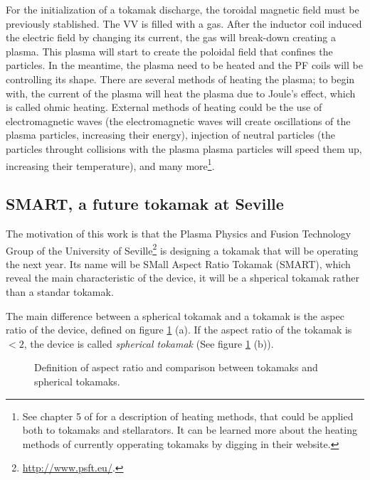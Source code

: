 \documentclass[a4paper,12pt,oneside]{book}
\begin{document}
For the initialization of a tokamak discharge, the toroidal magnetic field must be previously stablished. The VV is filled with a gas. After the inductor coil induced the electric field by changing its current, the gas will break-down creating a plasma. This plasma will start to create the poloidal field that confines the particles. In the meantime, the plasma need to be heated and the PF coils will be controlling its shape. There are several methods of heating the plasma; to begin with, the current of the plasma will heat the plasma due to Joule's effect, which is called ohmic heating. External methods of heating could be the use of electromagnetic waves (the electromagnetic waves will create oscillations of the plasma particles, increasing their energy), injection of neutral particles (the particles throught collisions with the plasma plasma particles will speed them up, increasing their temperature), and many more\footnote{See chapter 5 of \cite{Wesson} for a description of heating methods, that could be applied both to tokamaks and stellarators. It can be learned more about the heating methods of currently opperating tokamaks by digging in their website.}.



\subsection{SMART, a future tokamak at Seville}

The motivation of this work is that the Plasma Physics and Fusion Technology Group of the University of Seville\footnote{\url{http://www.psft.eu/}.} is designing a tokamak that will be operating the next year. Its name will be SMall Aspect Ratio Tokamak (SMART), which reveal the main characteristic of the device, it will be a shperical tokamak  rather than a standar tokamak. 

The main difference between a spherical tokamak and a tokamak is the aspec ratio of the device, defined on figure \ref{def aspect ratio} (a). If the aspect ratio of the tokamak is $< 2$, the device is called \textit{spherical tokamak} (See figure \ref{def aspect ratio} (b)).

\begin{figure}[htbp]
\centering
{}
\hfill
{}
\caption{Definition of aspect ratio and comparison between tokamaks and spherical tokamaks.}
\label{def aspect ratio}
\end{figure}
\end{document}
